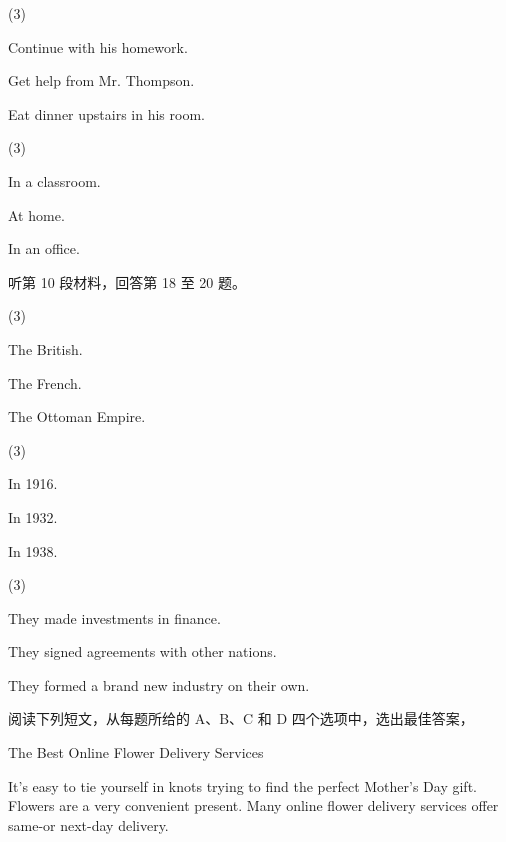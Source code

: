 \documentclass{英语试卷}
\begin{document}
\begin{choices}(3)
  \item Continue with his homework.
  \item Get help from Mr. Thompson.
  \item Eat dinner upstairs in his room.
\end{choices}
\begin{choices}(3)
  \item In a classroom.
  \item At home.
  \item In an office.
\end{choices}
\par 听第 10 段材料，回答第 18 至 20 题。\par
{}
\begin{choices}(3)
  \item The British.
  \item The French.
  \item The Ottoman Empire.
\end{choices}
\begin{choices}(3)
  \item In 1916.
  \item In 1932.
  \item In 1938.
\end{choices}
\begin{choices}(3)
  \item They made investments in finance.
  \item They signed agreements with other nations.
  \item They formed a brand new industry on their own.
\end{choices}
\par 阅读下列短文，从每题所给的 A、B、C 和 D 四个选项中，选出最佳答案，\par
{}
\par The Best Online Flower Delivery Services\par
\par It's easy to tie yourself in knots trying to find the perfect Mother's Day gift. Flowers are a very convenient present. Many online flower delivery services offer same-or next-day delivery.\par
\end{document}
